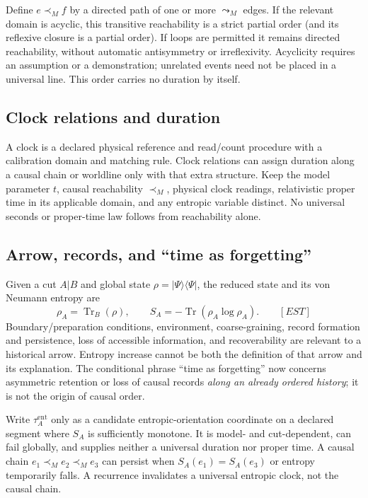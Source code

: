\documentclass[11pt]{article}
\newcommand{\est}{\textcolor{teal!70!black}{\textsf{\small[EST]}}}
\newcommand{\fields}{\textcolor{violet}{\textsf{\small[FIELDS]}}}
\newcommand{\asm}{\textcolor{blue!70!black}{\textsf{\small[ASM]}}}
\def\est{[EST]}\def\fields{[FIELDS]}\def\asm{[ASM]}%
\theoremstyle{definition}
\theoremstyle{remark}
\begin{document}
Define $e\prec_M f$ by a directed path of one or more $\leadsto_M$ edges. If the relevant domain is acyclic, this transitive reachability is a strict partial order (and its reflexive closure is a partial order). If loops are permitted it remains directed reachability, without automatic antisymmetry or irreflexivity. Acyclicity requires an assumption or a demonstration; unrelated events need not be placed in a universal line. This order carries no duration by itself.

\subsection*{Clock relations and duration}
A clock is a declared physical reference and read/count procedure with a calibration domain and matching rule. Clock relations can assign duration along a causal chain or worldline only with that extra structure. Keep the model parameter $t$, causal reachability $\prec_M$, physical clock readings, relativistic proper time in its applicable domain, and any entropic variable distinct. No universal seconds or proper-time law follows from reachability alone.

\subsection*{Arrow, records, and ``time as forgetting''}
Given a cut $A\vert B$ and global state $\rho=\lvert\Psi\rangle\langle\Psi\rvert$, the reduced state and its von Neumann entropy are
\[
 \rho_A=\operatorname{Tr}_B(\rho),\qquad S_A=-\operatorname{Tr}(\rho_A\log\rho_A).\qquad\est
\]
Boundary/preparation conditions, environment, coarse-graining, record formation and persistence, loss of accessible information, and recoverability are relevant to a historical arrow. Entropy increase cannot be both the definition of that arrow and its explanation. The conditional phrase ``time as forgetting'' now concerns asymmetric retention or loss of causal records \emph{along an already ordered history}; it is not the origin of causal order.

Write $\tau_A^{\mathrm{ent}}$ only as a candidate entropic-orientation coordinate on a declared segment where $S_A$ is sufficiently monotone. It is model- and cut-dependent, can fail globally, and supplies neither a universal duration nor proper time. A causal chain $e_1\prec_M e_2\prec_M e_3$ can persist when $S_A(e_1)=S_A(e_3)$ or entropy temporarily falls. A recurrence invalidates a universal entropic clock, not the causal chain.
\end{document}
